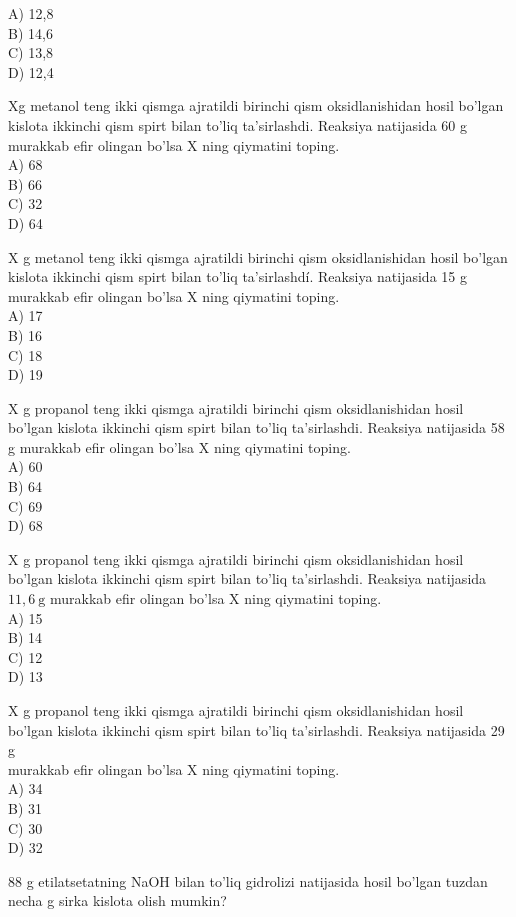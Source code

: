 A) 12,8\\
B) 14,6\\
C) 13,8\\
D) 12,4
  \item Xg metanol teng ikki qismga ajratildi birinchi qism oksidlanishidan hosil bo'lgan kislota ikkinchi qism spirt bilan to'liq ta'sirlashdi. Reaksiya natijasida 60 g murakkab efir olingan bo'lsa X ning qiymatini toping.\\
A) 68\\
B) 66\\
C) 32\\
D) 64
  \item X g metanol teng ikki qismga ajratildi birinchi qism oksidlanishidan hosil bo'lgan kislota ikkinchi qism spirt bilan to'liq ta'sirlashdí. Reaksiya natijasida 15 g murakkab efir olingan bo'lsa X ning qiymatini toping.\\
A) 17\\
B) 16\\
C) 18\\
D) 19
  \item X g propanol teng ikki qismga ajratildi birinchi qism oksidlanishidan hosil bo'lgan kislota ikkinchi qism spirt bilan to'liq ta'sirlashdi. Reaksiya natijasida 58 g murakkab efir olingan bo'lsa X ning qiymatini toping.\\
A) 60\\
B) 64\\
C) 69\\
D) 68
  \item X g propanol teng ikki qismga ajratildi birinchi qism oksidlanishidan hosil bo'lgan kislota ikkinchi qism spirt bilan to'liq ta'sirlashdi. Reaksiya natijasida $11,6 \mathrm{~g}$ murakkab efir olingan bo'lsa X ning qiymatini toping.\\
A) 15\\
B) 14\\
C) 12\\
D) 13
  \item X g propanol teng ikki qismga ajratildi birinchi qism oksidlanishidan hosil bo'lgan kislota ikkinchi qism spirt bilan to'liq ta'sirlashdi. Reaksiya natijasida 29 g\\
murakkab efir olingan bo'lsa X ning qiymatini toping.\\
A) 34\\
B) 31\\
C) 30\\
D) 32
  \item 88 g etilatsetatning NaOH bilan to'liq gidrolizi natijasida hosil bo'lgan tuzdan necha g sirka kislota olish mumkin?\\
